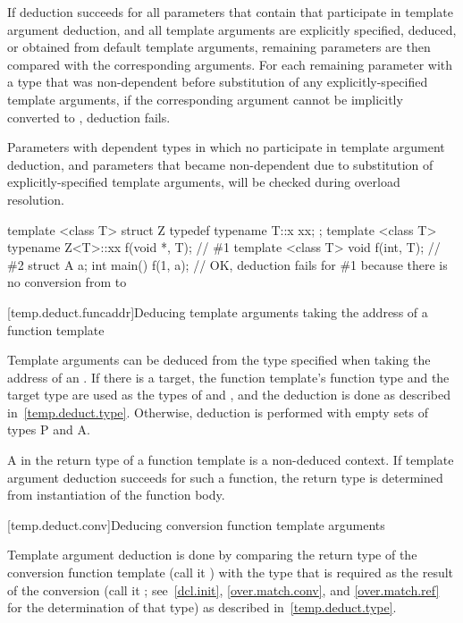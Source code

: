 \pnum
If deduction succeeds for all parameters that contain
 that participate in template argument
deduction, and all template arguments are explicitly specified, deduced,
or obtained from default template arguments, remaining parameters are then
compared with the corresponding arguments. For each remaining parameter
 with a type that was non-dependent before substitution of any
explicitly-specified template arguments, if the corresponding argument
 cannot be implicitly converted to , deduction fails.
\begin{note}
Parameters with dependent types in which no 
participate in template argument deduction, and parameters that became
non-dependent due to substitution of explicitly-specified template arguments,
will be checked during overload resolution.
\end{note}
\begin{example}
\begin{codeblock}
template <class T> struct Z {
  typedef typename T::x xx;
};
template <class T> typename Z<T>::xx f(void *, T);      // \#1
template <class T> void f(int, T);                      // \#2
struct A {} a;
int main() {
  f(1, a);          // OK, deduction fails for \#1 because there is no conversion from  to 
}
\end{codeblock}
\end{example}

[temp.deduct.funcaddr]{Deducing template arguments taking the address of a function template}

\pnum
Template arguments can be deduced from the type specified when taking
the address of an .
If there is a target,
the function template's function type and the target type
are used as the types of
and
,
and the deduction is done as
described in~\ref{temp.deduct.type}.
Otherwise, deduction is performed with empty sets of types P and A.

\pnum
A  in the return type of a
function template is a non-deduced context. If template argument
deduction succeeds for such a function, the return type is determined
from instantiation of the function body.

[temp.deduct.conv]{Deducing conversion function template arguments}

\pnum
Template argument deduction is done by comparing the return type of
the
conversion function template
(call it
)
with the type that is
required as the result of the conversion (call it
; see~\ref{dcl.init}, \ref{over.match.conv}, and \ref{over.match.ref}
for the determination of that type)
as described in~\ref{temp.deduct.type}.

